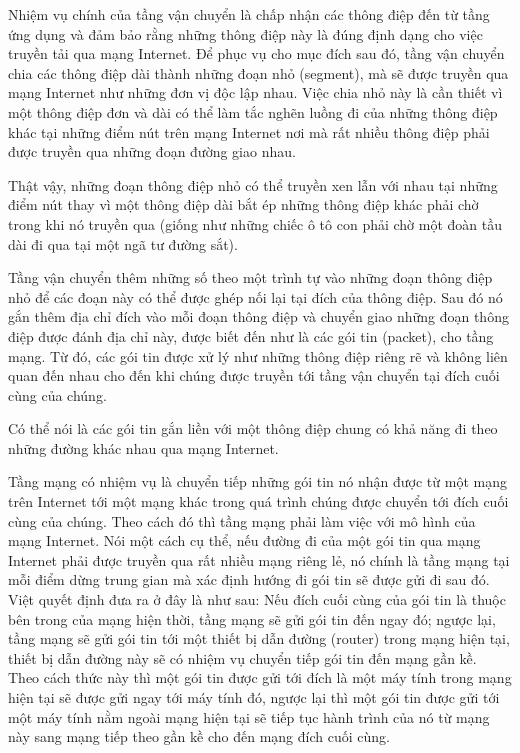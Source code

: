 Nhiệm vụ chính của tầng vận chuyển là chấp nhận các thông điệp đến từ tầng ứng dụng và đảm
bảo rằng những thông điệp này là đúng định dạng cho việc truyền tải qua mạng Internet. Để
phục vụ cho mục đích sau đó, tầng vận chuyển chia các thông điệp dài thành những đoạn nhỏ
(segment), mà sẽ được truyền qua mạng Internet như những đơn vị độc lập nhau. Việc chia
nhỏ này là cần thiết vì một thông điệp đơn và dài có thể làm tắc nghẽn luồng đi của những
thông điệp khác tại những điểm nút trên mạng Internet nơi mà rất nhiều thông điệp phải
được truyền qua những đoạn đường giao nhau.

Thật vậy, những đoạn thông điệp nhỏ có thể truyền xen lẫn với nhau tại những điểm nút thay vì một thông điệp dài bắt ép những thông điệp khác phải chờ trong khi nó truyền qua (giống
như những chiếc ô tô con phải chờ một đoàn tầu dài đi qua tại một ngã tư đường sắt).

Tầng vận chuyển thêm những số theo một trình tự vào những đoạn thông điệp nhỏ để các đoạn
này có thể được ghép nối lại tại đích của thông điệp. Sau đó nó gắn thêm địa chỉ đích vào
mỗi đoạn thông điệp và chuyển giao những đoạn thông điệp được đánh địa chỉ này, được biết
đến như là các gói tin (packet), cho tầng mạng. Từ đó, các gói tin được xử lý như những
thông điệp riêng rẽ và không liên quan đến nhau cho đến khi chúng được truyền tới tầng vận
chuyển tại đích cuối cùng của chúng.

Có thể nói là các gói tin gắn liền với một thông điệp chung có khả năng đi theo những
đường khác nhau qua mạng Internet.

Tầng mạng có nhiệm vụ là chuyển tiếp những gói tin nó nhận được từ một mạng trên Internet
tới một mạng khác trong quá trình chúng được chuyển tới đích cuối cùng của chúng. Theo
cách đó thì tầng mạng phải làm việc với mô hình của mạng Internet. Nói một cách cụ thể,
nếu đường đi của một gói tin qua mạng Internet phải được truyền qua rất nhiều mạng riêng
lẻ, nó chính là tầng mạng tại mỗi điểm dừng trung gian mà xác định hướng đi  gói tin sẽ
được gửi đi sau đó. Việt quyết định đưa ra ở đây là như sau: Nếu đích cuối cùng của gói
tin là thuộc bên trong của mạng hiện thời, tầng mạng sẽ gửi gói tin đến ngay đó; ngược
lại, tầng mạng sẽ gửi gói tin tới một thiết bị dẫn đường (router) trong mạng hiện tại,
thiết bị dẫn đường này sẽ có nhiệm vụ chuyển tiếp gói tin đến mạng gần kề. Theo cách thức
này thì một gói tin được gửi tới đích là một máy tính trong mạng hiện tại sẽ được gửi ngay
tới máy tính đó, ngược lại thì một gói tin được gửi tới một máy tính nằm ngoài mạng hiện
tại sẽ tiếp tục hành trình của nó từ mạng này sang mạng tiếp theo gần kề cho đến mạng đích
cuối cùng.

